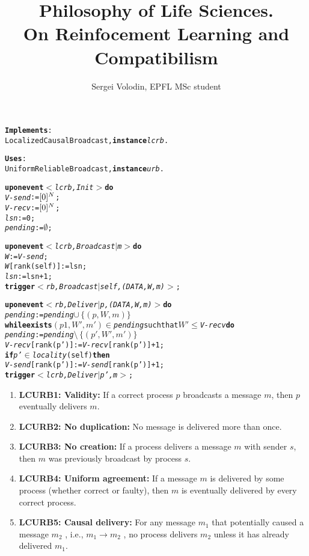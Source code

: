 \documentclass[a4paper]{article}
\title{Philosophy of Life Sciences.\\ On Reinfocement Learning and Compatibilism}
\author{Sergei Volodin, EPFL MSc student}
\date{}
\begin{document}
	
\maketitle

\begin{alltt}
\normalfont
\textbf{Implements}:
    LocalizedCausalBroadcast, \textbf{instance} \textit{lcrb}.

\textbf{Uses}:
    UniformReliableBroadcast, \textbf{instance} \textit{urb}.

\textbf{upon event} \textit{\(<\)lcrb, Init\(>\)} \textbf{do}
    \textit{V-send} := \([0]\sp{N}\);
    \textit{V-recv} := \([0]\sp{N}\);
    \textit{lsn} := 0;
    \textit{pending} := \(\emptyset\);

\textbf{upon event} \textit{\(<\)lcrb, Broadcast \(|\) \textit{m}\(>\)} \textbf{do}
    \textit{W} := \textit{V-send};
    \textit{W}[rank(self)] := lsn;
    \textit{lsn} := lsn + 1;
    \textbf{trigger} \textit{\(<\)rb, Broadcast \(|\) self, (DATA, W, m)\(>\)};

\textbf{upon event} \textit{\(<\)rb, Deliver \(|\) p, (DATA, W, m)\(>\)} \textbf{do}
    \textit{pending} := \textit{pending} \(\cup\,\{(p,W,m)\}\) 
    \textbf{while exists} \((p1,W',m')\) \(\in\) \textit{pending} such that \(W'\leq \)\textit{V-recv} \textbf{do}
        \textit{pending} := \textit{pending} \(\setminus\,\{(p',W',m')\}\)
        \textit{V-recv}[rank(p')] := \textit{V-recv}[rank(p')] + 1;
        \textbf{if} \textit{p'} \(\in\) \textit{locality}(self) \textbf{then}
            \textit{V-send}[rank(p')] := \textit{V-send}[rank(p')] + 1;
        \textbf{trigger} \textit{\(<\)lcrb, Deliver \(|\) p', m\(>\)};
\end{alltt}

\begin{enumerate}
	\item {\bf LCURB1: Validity:} If a correct process $p$ broadcasts a message $m$, then $p$ eventually delivers $m$.
	
	\item {\bf LCURB2: No duplication:} No message is delivered more than once.
	
	\item {\bf LCURB3: No creation:} If a process delivers a message $m$ with sender $s$, then $m$ was previously broadcast by process $s$.
	
	\item {\bf LCURB4: Uniform agreement:} If a message $m$ is delivered by some process (whether correct or faulty), then $m$ is eventually delivered by every correct process.
	
	\item {\bf LCURB5: Causal delivery:} For any message $m_1$ that potentially caused a message $m_2$ , i.e., $m_1\to m_2$ , no process delivers $m_2$ unless it has already delivered $m_1$.
	
\end{enumerate}
\end{document}
